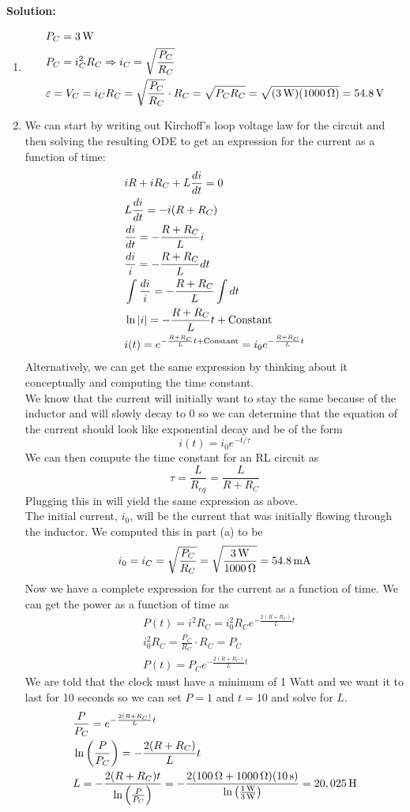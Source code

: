 \textbf{Solution:}
\begin{enumerate}
\item
\begin{align*}
    &P_C=3\units{W}\\
    &P_C=i_C^2R_C\Ra i_C=\sqrt{\frac{P_C}{R_C}}\\
    &\varepsilon=V_C=i_CR_C=\sqrt{\frac{P_C}{R_C}}\cdot R_C=\sqrt{P_CR_C}=\sqrt{(3\units{W})(1000\units{\Omega})}=54.8\units{V}
\end{align*}
\item We can start by writing out Kirchoff's loop voltage law for the circuit and then solving the resulting ODE to get an expression for the current as a function of time:
\begin{align*}
    &iR+iR_C+L\ddx[i]{t}=0\\
    &L\ddx[i]{t}=-i(R+R_C)\\
    &\ddx[i]{t}=-\frac{R+R_C}{L}i\\
    &\frac{di}{i}=-\frac{R+R_C}{L}dt\\
    &\int\frac{di}{i}=-\frac{R+R_C}{L}\int dt\\
    &\ln|i|=-\frac{R+R_C}{L}t+\text{Constant}\\
    &i(t)=e^{-\frac{R+R_C}{L}t+\text{Constant}}=i_0e^{-\frac{R+R_C}{L}t}
\end{align*}
Alternatively, we can get the same expression by thinking about it conceptually and computing the time constant.\\
We know that the current will initially want to stay the same because of the inductor and will slowly decay to 0 so we can determine that the equation of the current should look like exponential decay and be of the form
\[i(t)=i_0e^{-t/\tau}\]
We can then compute the time constant for an RL circuit as
\[\tau=\frac{L}{R_{eq}}=\frac{L}{R+R_C}\]
Plugging this in will yield the same expression as above.\\
The initial current, $i_0$, will be the current that was initially flowing through the inductor. We computed this in part (a) to be
\[i_0=i_C=\sqrt{\frac{P_C}{R_C}}=\sqrt{\frac{3\units{W}}{1000\units{\Omega}}}=54.8\units{mA}\]
Now we have a complete expression for the current as a function of time. We can get the power as a function of time as
\begin{align*}
    &P(t)=i^2R_C=i_0^2R_Ce^{-\frac{2(R+R_C)}{L}t}\\
    &i_0^2R_C=\frac{P_C}{R_C}\cdot R_C=P_C\\
    &P(t)=P_Ce^{-\frac{2(R+R_C)}{L}t}
\end{align*}
We are told that the clock must have a minimum of 1 Watt and we want it to last for 10 seconds so we can set $P=1$ and $t=10$ and solve for $L$.
\begin{align*}
    &\frac{P}{P_C}=e^{-\frac{2(R+R_C)}{L}t}\\
    &\ln\bfrac{P}{P_C}=-\frac{2(R+R_C)}{L}t\\
    &L=-\frac{2(R+R_C)t}{\ln\bfrac{P}{P_C}}=-\frac{2(100\units{\Omega}+1000\units{\Omega})(10\units{s})}{\ln\bfrac{1\units{W}}{3\units{W}}}=20,025\units{H}
\end{align*}
\end{enumerate}